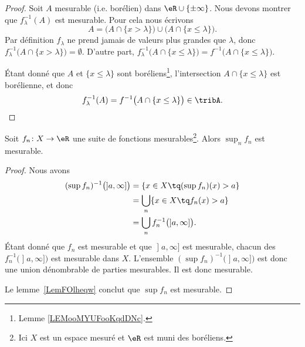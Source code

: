 \begin{proof}
	Soit \( A\) mesurable (i.e. borélien) dans \( \eR\cup\{ \pm\infty \}\). Nous devons montrer que \( f_{\lambda}^{-1}(A)\) est mesurable. Pour cela nous écrivons
	\begin{equation}
		A=\Big( A\cap\{ x>\lambda \}\Big)\cup\Big(  A\cap\{ x\leq \lambda \}\Big).
	\end{equation}
	Par définition \( f_{\lambda}\) ne prend jamais de valeurs plus grandes que \( \lambda\), donc \( f_{\lambda}^{-1}\big( A\cap\{ x>\lambda \} \big)=\emptyset\). D'autre part, \( f_{\lambda}^{-1}\big( A\cap\{ x\leq \lambda \} \big)=f^{-1}\big( A\cap\{ x\leq \lambda \} \big)\).

	Étant donné que \( A\) et \( \{ x\leq \lambda \}\) sont boréliens\footnote{Lemme \ref{LEMooMYUFooKqdDNc}.}, l'intersection \( A\cap\{ x\leq \lambda \}\) est borélienne, et donc
	\begin{equation}
		f_{\lambda}^{-1}(A)=f^{-1}\big( A\cap\{ x\leq\lambda \} \big)\in\tribA.
	\end{equation}
\end{proof}

\begin{lemma}   \label{LemIGKvbNR}
	Soit \( f_n\colon X\to \eR\) une suite de fonctions mesurables\footnote{Ici \( X\) est un espace mesuré et \( \eR\) est muni des boréliens.}. Alors \( \sup_n f_n\) est mesurable.
\end{lemma}

\begin{proof}
	Nous avons
	\begin{subequations}
		\begin{align}
			(\sup f_n)^{-1}\big( \mathopen] a , \infty \mathclose] \big) & =\{ x\in X \tq (\sup f_n)(x)>a \}                                \\
			                                                             & =\bigcup_n\{ x\in X\tq f_n(x)>a \}                               \\
			                                                             & =\bigcup_nf_n^{-1}\big( \mathopen] a , \infty \mathclose] \big).
		\end{align}
	\end{subequations}
	Étant donné que \( f_n\) est mesurable et que \( \mathopen] a , \infty \mathclose]\) est mesurable, chacun des \( f_n^{-1}\big( \mathopen] a , \infty \mathclose] \big) \) est mesurable dans \( X\). L'ensemble \( (\sup f_n)^{-1}\big( \mathopen] a , \infty \mathclose] \big)\) est donc une union dénombrable de parties mesurables. Il est donc mesurable.

	Le lemme~\ref{LemFOlheqw} conclut que \( \sup f_n\) est mesurable.
\end{proof}

